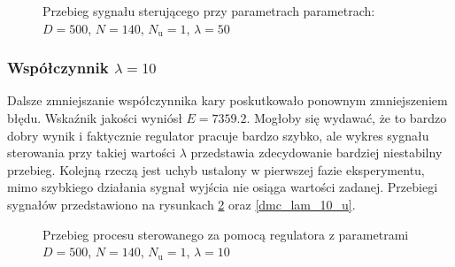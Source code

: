 \begin{figure}[b]
    \centering
    \caption{Przebieg sygnału sterującego przy parametrach parametrach: $D = 500$, $N = 140$, $N_{\mathrm{u}} = 1$, $\lambda = 50$}
    \label{dmc_lam_50_u}
\end{figure}

\subsubsection{Współczynnik $\lambda = 10$}
Dalsze zmniejszanie współczynnika kary poskutkowało ponownym zmniejszeniem błędu. Wskaźnik jakości wyniósł $E = \num{7359,2}$. Mogłoby się wydawać, że to bardzo dobry wynik i faktycznie regulator pracuje bardzo szybko, ale wykres sygnału sterowania przy takiej wartości $\lambda$ przedstawia zdecydowanie bardziej niestabilny przebieg. Kolejną rzeczą jest uchyb ustalony w pierwszej fazie eksperymentu, mimo szybkiego działania sygnał wyjścia nie osiąga wartości zadanej. Przebiegi sygnałów przedstawiono na rysunkach \ref{dmc_lam_10_y} oraz \ref{dmc_lam_10_u}. 

\begin{figure}[t]
    \centering
    \caption{Przebieg procesu sterowanego za pomocą regulatora z parametrami $D = 500$, $N = 140$, $N_{\mathrm{u}} = 1$, $\lambda = 10$}
    \label{dmc_lam_10_y}
\end{figure}

